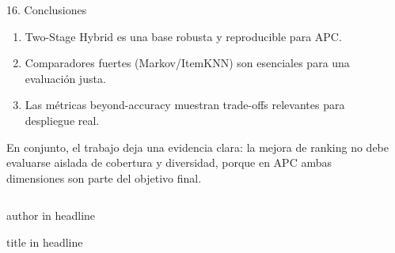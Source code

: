 ﻿\documentclass[final]{beamer}
\newlength{\sepwidth}
\newlength{\colwidth}
\newcommand{\separatorcolumn}{\begin{column}{\sepwidth}\end{column}}
\begin{document}
\begin{frame}[t]
\begin{columns}[t]
\begin{column}{\colwidth}
\vspace{0.06cm}

\begin{exampleblock}{16. Conclusiones}
\begin{enumerate}
  \item Two-Stage Hybrid es una base robusta y reproducible para APC.
  \item Comparadores fuertes (Markov/ItemKNN) son esenciales para una evaluación justa.
  \item Las métricas beyond-accuracy muestran trade-offs relevantes para despliegue real.
\end{enumerate}

\vspace{0.05cm}
En conjunto, el trabajo deja una evidencia clara: la mejora de ranking no debe evaluarse aislada de cobertura y diversidad, porque en APC ambas dimensiones son parte del objetivo final.
\end{exampleblock}

\end{column}

\separatorcolumn
\end{columns}

\vspace{0.10cm}
\begin{beamercolorbox}[wd=\textwidth,ht=0.12cm,dp=0cm]{author in headline}\end{beamercolorbox}
\vspace{0.02cm}
\begin{beamercolorbox}[wd=\textwidth,ht=0.06cm,dp=0cm]{title in headline}\end{beamercolorbox}

\end{frame}
\end{document}

